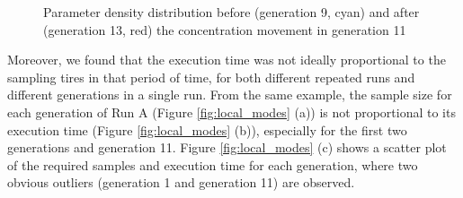 \begin{figure}[ht!]
    \begin{center}
    \end{center}

    \caption[Parameter density distribution before and after the concentration movement in generation 11]{Parameter density distribution before (generation 9, cyan) and after (generation 13, red) the concentration movement in generation 11}
    \label{fig:local_para}
\end{figure}

Moreover, we found that the execution time was not ideally proportional to the sampling tires in that period of time, for both different repeated runs and different generations in a single run. From the same example, the sample size for each generation of Run A (Figure \ref{fig:local_modes} (a)) is not proportional to its execution time (Figure \ref{fig:local_modes} (b)), especially for the first two generations and generation 11. Figure \ref{fig:local_modes} (c) shows a scatter plot of the required samples and execution time for each generation, where two obvious outliers (generation 1 and generation 11) are observed.



